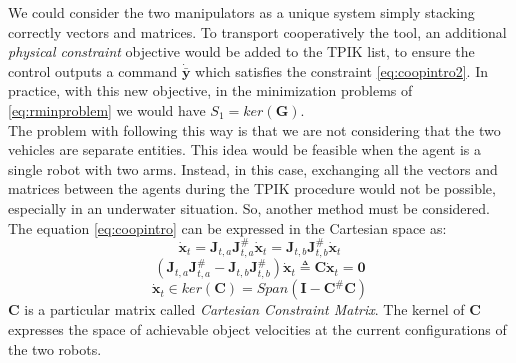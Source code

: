 We could consider the two manipulators as a unique system simply stacking correctly vectors and matrices. To transport cooperatively the tool, an additional \textit{physical constraint} objective would be added to the TPIK list, to ensure the control outputs a command $\dot{\bar{\boldsymbol{y}}}$ which satisfies the constraint \eqref{eq:coopintro2}. In practice, with this new objective, in the minimization problems of \eqref{eq:rminproblem} we would have $S_1 = ker(\boldsymbol{G})$.\\
The problem with following this way is that we are not considering that the two vehicles are separate entities. This idea would be feasible when the agent is a single robot with two arms. Instead, in this case, exchanging all the vectors and matrices between the agents during the TPIK procedure would not be possible, especially in an underwater situation. So, another method must be considered.\\

\noindent The equation \eqref{eq:coopintro} can be expressed in the Cartesian space as:
\begin{equation}
	\dot{\boldsymbol{x}}_t = \boldsymbol{J}_{t,a} \boldsymbol{J}^\#_{t,a} \dot{\boldsymbol{x}}_t =  \boldsymbol{J}_{t,b} \boldsymbol{J}^\#_{t,b} 
	\dot{\boldsymbol{x}}_t 
\end{equation}
\begin{equation}
\label{eq:constrainMatrixC}
	(\boldsymbol{J}_{t,a} \boldsymbol{J}^\#_{t,a} - \boldsymbol{J}_{t,b} \boldsymbol{J}^\#_{t,b}) 
	\dot{\boldsymbol{x}}_t \triangleq \boldsymbol{C} \dot{\boldsymbol{x}}_t = \boldsymbol{0}
\end{equation}
\begin{equation}
	\dot{\boldsymbol{x}}_t \in ker(\boldsymbol{C}) = Span(\boldsymbol{I} - \boldsymbol{C}^\#\boldsymbol{C})
\end{equation}
$\boldsymbol{C}$ is a particular matrix called \textit{Cartesian Constraint Matrix}. The kernel of $\boldsymbol{C}$ expresses the space of achievable object velocities at the current configurations of the two robots.\\

